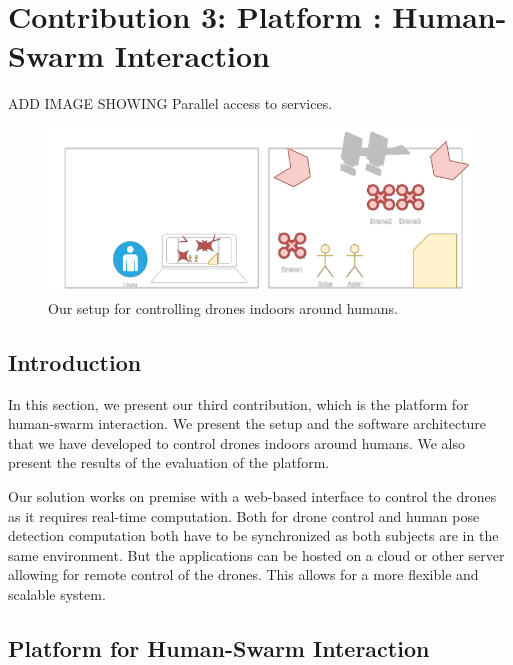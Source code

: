 
\section{Contribution 3: Platform : Human-Swarm Interaction}
ADD IMAGE SHOWING Parallel access to services.
\begin{figure}[htbp]
    \centerline{\includegraphics{images/setting.png}}
    \caption{ Our setup for controlling drones indoors around humans. }
    \label{fig}
    \end{figure}	



\subsection{Introduction}
In this section, we present our third contribution, which is the platform for human-swarm interaction. We present the setup and the software architecture that we have developed to control drones indoors around humans. We also present the results of the evaluation of the platform.

Our solution works on premise with a web-based interface to control the drones as it requires real-time computation. Both for drone control and human pose detection computation both have to be synchronized as both subjects are in the same environment. But the applications can be hosted on a cloud or other server allowing for remote control of the drones. This allows for a more flexible and scalable system.

\subsection{Platform for Human-Swarm Interaction}


